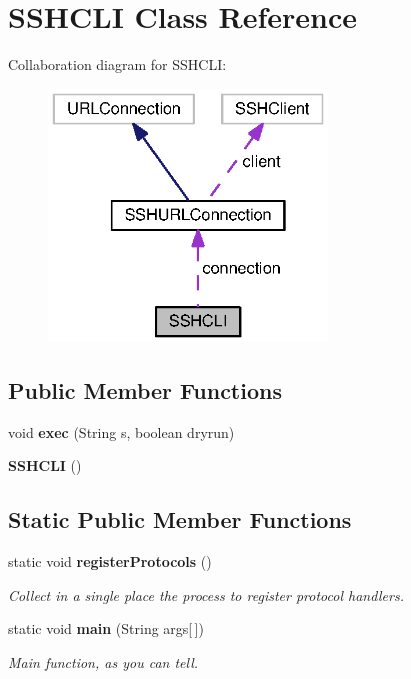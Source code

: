 \section{S\+S\+H\+C\+L\+I Class Reference}
\label{classorg_1_1smallfoot_1_1parser_1_1SSHCLI}


Collaboration diagram for S\+S\+H\+C\+L\+I\+:\nopagebreak
\begin{figure}[H]
\begin{center}
\leavevmode
\includegraphics[width=210pt]{classorg_1_1smallfoot_1_1parser_1_1SSHCLI__coll__graph}
\end{center}
\end{figure}
\subsection*{Public Member Functions}
\begin{DoxyCompactItemize}
\item 
void {\bf exec} (String s, boolean dryrun)
\item 
{\bf S\+S\+H\+C\+L\+I} ()
\end{DoxyCompactItemize}
\subsection*{Static Public Member Functions}
\begin{DoxyCompactItemize}
\item 
static void {\bf register\+Protocols} ()
\begin{DoxyCompactList}\small\item\em Collect in a single place the process to register protocol handlers. \end{DoxyCompactList}\item 
static void {\bf main} (String args[$\,$])
\begin{DoxyCompactList}\small\item\em Main function, as you can tell. \end{DoxyCompactList}\end{DoxyCompactItemize}


